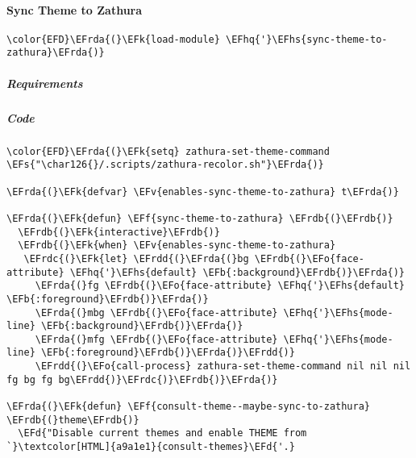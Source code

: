 \documentclass[a4wide,10pt]{article}
\newcommand{\EFs}[1]{\textcolor{EFs}{#1}} %
\newcommand{\EFd}[1]{\textcolor{EFd}{#1}} %
\newcommand{\EFk}[1]{\textcolor{EFk}{#1}} %
\newcommand{\EFb}[1]{\textcolor{EFb}{#1}} %
\newcommand{\EFf}[1]{\textcolor{EFf}{#1}} %
\newcommand{\EFv}[1]{\textcolor{EFv}{#1}} %
\newcommand{\EFo}[1]{\textcolor{EFo}{#1}} %
\newcommand{\EFhq}[1]{\textcolor{EFhq}{#1}} %
\newcommand{\EFhs}[1]{\textcolor{EFhs}{#1}} %
\newcommand{\EFrda}[1]{\textcolor{EFrda}{#1}} %
\newcommand{\EFrdb}[1]{\textcolor{EFrdb}{#1}} %
\newcommand{\EFrdc}[1]{\textcolor{EFrdc}{#1}} %
\newcommand{\EFrdd}[1]{\textcolor{EFrdd}{#1}} %
\begin{document}
\paragraph{Sync Theme to Zathura}
\label{sec:orga9c1ee2}
\begin{Code}
\begin{Verbatim}
\color{EFD}\EFrda{(}\EFk{load-module} \EFhq{'}\EFhs{sync-theme-to-zathura}\EFrda{)}
\end{Verbatim}
\end{Code}
\subparagraph{Requirements}
\label{sec:orgdc25fb5}
\subparagraph{Code}
\label{sec:org12dc36e}
\begin{Code}
\begin{Verbatim}
\color{EFD}\EFrda{(}\EFk{setq} zathura-set-theme-command \EFs{"\char126{}/.scripts/zathura-recolor.sh"}\EFrda{)}

\EFrda{(}\EFk{defvar} \EFv{enables-sync-theme-to-zathura} t\EFrda{)}

\EFrda{(}\EFk{defun} \EFf{sync-theme-to-zathura} \EFrdb{(}\EFrdb{)}
  \EFrdb{(}\EFk{interactive}\EFrdb{)}
  \EFrdb{(}\EFk{when} \EFv{enables-sync-theme-to-zathura}
   \EFrdc{(}\EFk{let} \EFrdd{(}\EFrda{(}bg \EFrdb{(}\EFo{face-attribute} \EFhq{'}\EFhs{default} \EFb{:background}\EFrdb{)}\EFrda{)}
     \EFrda{(}fg \EFrdb{(}\EFo{face-attribute} \EFhq{'}\EFhs{default} \EFb{:foreground}\EFrdb{)}\EFrda{)}
     \EFrda{(}mbg \EFrdb{(}\EFo{face-attribute} \EFhq{'}\EFhs{mode-line} \EFb{:background}\EFrdb{)}\EFrda{)}
     \EFrda{(}mfg \EFrdb{(}\EFo{face-attribute} \EFhq{'}\EFhs{mode-line} \EFb{:foreground}\EFrdb{)}\EFrda{)}\EFrdd{)}
     \EFrdd{(}\EFo{call-process} zathura-set-theme-command nil nil nil fg bg fg bg\EFrdd{)}\EFrdc{)}\EFrdb{)}\EFrda{)}

\EFrda{(}\EFk{defun} \EFf{consult-theme--maybe-sync-to-zathura} \EFrdb{(}theme\EFrdb{)}
  \EFd{"Disable current themes and enable THEME from `}\textcolor[HTML]{a9a1e1}{consult-themes}\EFd{'.}


\end{Verbatim}
\end{Code}
\end{document}
